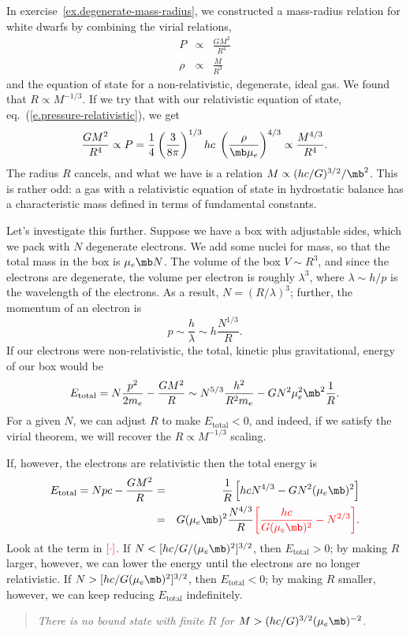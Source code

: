 In exercise~\ref{ex.degenerate-mass-radius}, we constructed a mass-radius relation for white dwarfs by combining the virial relations,
\begin{eqnarray*}
   P    &\propto& \frac{GM^{2}}{R^{4}}\\
   \rho &\propto& \frac{M}{R^{3}}
\end{eqnarray*}
and the equation of state for a non-relativistic, degenerate, ideal gas.  We found that $R\propto M^{-1/3}$.  If we try that with our relativistic equation of state, eq.~(\ref{e.pressure-relativistic}), we get
\[
	\frac{GM^{2}}{R^{4}} \propto P = \frac{1}{4}\left(\frac{3}{8\pi}\right)^{1/3}hc\; \left(\frac{\rho}{\mb\mu_{e}}\right)^{4/3} \propto \frac{M^{4/3}}{R^{4}}.
\]
The radius $R$ cancels, and what we have is a relation $M\propto (hc/G)^{3/2}/\mb^{2}$.  This is rather odd: a gas with a relativistic equation of state in hydrostatic balance has a characteristic mass defined in terms of fundamental constants.

Let's investigate this further. Suppose we have a box with adjustable sides, which we pack with $N$ degenerate electrons. We add some nuclei for mass, so that the total mass in the box is $\mu_{e}\mb N$. The volume of the box $V \sim R^{3}$, and since the electrons are degenerate, the volume per electron is roughly $\lambda^{3}$, where $\lambda \sim h/p$ is the wavelength of the electrons.  As a result, $N = (R/\lambda)^{3}$; further, the momentum of an electron is
\[	p \sim \frac{h}{\lambda} \sim h\frac{N^{1/3}}{R}. \]
If our electrons were non-relativistic, the total, kinetic plus gravitational, energy of our box would be
\[
	E_{\mathrm{total}} = N\frac{p^{2}}{2m_{e}} - \frac{GM^{2}}{R} \sim N^{5/3}\frac{h^{2}}{R^{2}m_{e}} - GN^{2}\mu_{e}^{2}\mb^{2} \frac{1}{R}.
\]
For a given $N$, we can adjust $R$ to make $E_{\mathrm{total}}<0$, and indeed, if we satisfy the virial theorem, we will recover the $R\propto M^{-1/3}$ scaling.

If, however, the electrons are relativistic then the total energy is
\begin{eqnarray*}
	E_{\mathrm{total}} = Npc - \frac{GM^{2}}{R} 
		&=& \frac{1}{R}\left[hc N^{4/3} - G N^{2}(\mu_{e}\mb)^{2}\right]\\
		&=& G(\mu_{e}\mb)^{2}\frac{N^{4/3}}{R}
		{\color{red}\left[ \frac{hc}{G(\mu_{e}\mb)^{2}} - N^{2/3}\right]}.
\end{eqnarray*}
Look at the term in $\color{red}\left[\cdot\right]$.
If $N < [hc/G/(\mu_{e}\mb)^{2}]^{3/2}$, then $E_{\mathrm{total}} > 0$; by making $R$ larger, however, we can lower the energy until the electrons are no longer relativistic.  If $N > [hc/G(\mu_{e}\mb)^{2}]^{3/2}$, then $E_{\mathrm{total}} < 0$; by making $R$ smaller, however, we can keep reducing $E_{\mathrm{total}}$ indefinitely.
\begin{quote}\itshape
There is no bound state with finite $R$ for $M>(hc/G)^{3/2}(\mu_{e}\mb)^{-2}$.
\end{quote}

